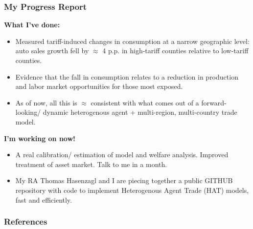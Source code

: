 \documentclass[9pt,pdftex,aspectratio=1610]{beamer}
\theoremstyle{definition}
\begin{document}
\begin{frame}[t]
\frametitle{My Progress Report}
\textbf{What I've done:}
\begin{itemize}
\item Measured tariff-induced changes in consumption at a narrow geographic level: auto sales growth fell by $\approx$ 4 p.p. in high-tariff counties relative to low-tariff counties.
\smallskip
\item Evidence that the fall in consumption relates to a reduction in production and labor market opportunities for those most exposed.
\smallskip
\item As of now, all this is $\approx$ consistent with what comes out of a forward-looking/ dynamic heterogenous agent +  multi-region, multi-country trade model.
\end{itemize}
\bigskip
\textbf{I'm working on now!}
\begin{itemize}
\item A real calibration/ estimation of model and welfare analysis. Improved treatment of asset market. Talk to me in a month.
\smallskip
\item My RA Thomas Hasenzagl and I are piecing together a public GITHUB repository with code to implement Heterogenous Agent Trade (HAT) models, fast and efficiently.
\end{itemize}
\end{frame}


\appendix

\setcounter{finalframe}{\value{framenumber}}

\begin{frame}[allowframebreaks]
\frametitle{References}
\scriptsize

\end{frame}


\end{document}

